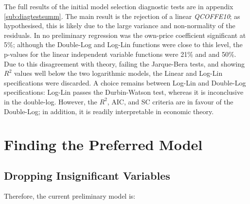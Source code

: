 \documentclass[12pt]{article}
\begin{document}
The full results of the initial model selection diagnostic tests are in appendix \ref{sub:diagtestsumm}. The main result is the rejection of a linear \emph{QCOFFE10}; as hypothesised, this is likely due to the large variance and non-normality of the residuals. In no preliminary regression was the own-price coefficient significant at 5\%; although the Double-Log and Log-Lin functions were close to this level, the p-values for the linear independent variable functions were 21\% and and 50\%. Due to this disagreement with theory, failing the Jarque-Bera tests, and showing \(R^2\) values well below the two logarithmic models, the Linear and Log-Lin specifications were discarded. A choice remains between Log-Lin and Double-Log specifications: Log-Lin passes the Durbin-Watson test, whereas it is inconclusive in the double-log. However, the \(R^2\), AIC, and SC criteria are in favour of the Double-Log; in addition, it is readily interpretable in economic theory. 


\section{Finding the Preferred Model} %
\label{sec:finding_the_preferred_model}
\subsection{Dropping Insignificant Variables} %
\label{sub:dropping_insignificant_variables}
Therefore, the current preliminary model is:
\end{document}
